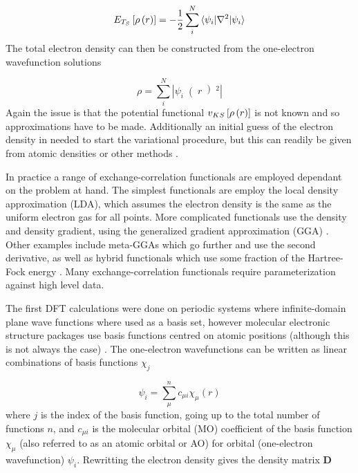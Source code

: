 \begin{equation}
    E_{T_S} \left[ \rho\left(r\right) \right] = -\frac{1}{2} \sum_i^N \braket{\psi_i|\nabla^2|\psi_i}
\end{equation}
%
The total electron density can then be constructed from the one-electron wavefunction
solutions

\begin{equation}
    \rho = \sum_i^N \left\lvert \psi_i \right( r \left)^2 \right\rvert 
\end{equation}
%
Again the issue is that the potential functional $v_{KS} \left[ \rho\left(r\right) \right]$ is
not known and so approximations have to be made. Additionally an initial guess of
the electron density in needed to start the variational procedure, but this can 
readily be given from atomic densities or other methods \cite{Lehtola2019}.

In practice a range of exchange-correlation functionals are employed dependant on
the problem at hand. The simplest functionals are employ the local density approximation
(LDA), which assumes the electron density is the same as the uniform electron gas
for all points. More complicated functionals use the density and density gradient,
using the generalized gradient approximation (GGA) \cite{Langreth1983}. Other examples
include meta-GGAs which go further and use the second derivative, as well as hybrid
functionals which use some fraction of the Hartree-Fock energy \cite{Sun2011, Becke1993}. 
Many exchange-correlation functionals require parameterization against high level
data.

The first DFT calculations were done on periodic systems where infinite-domain plane
wave functions where used as a basis set, however molecular electronic structure
packages use basis functions centred on atomic positions (although this is not always
the case) \cite{Boys1950}. The one-electron wavefunctions can be written as linear
combinations of basis functions $\chi_j$

\begin{equation}
    \psi_i = \sum_\mu^n c_{\mu i} \chi_\mu \left( r\right)
\end{equation}
%
where $j$ is the index of the basis function, going up to the total number of functions
$n$, and $c_{\mu i}$ is the molecular orbital (MO) coefficient of the basis function
$\chi_\mu$ (also referred to as an atomic orbital or AO) for orbital (one-electron 
wavefunction) $\psi_i$. Rewritting the electron density gives the density matrix 
$\mathbf{D}$

